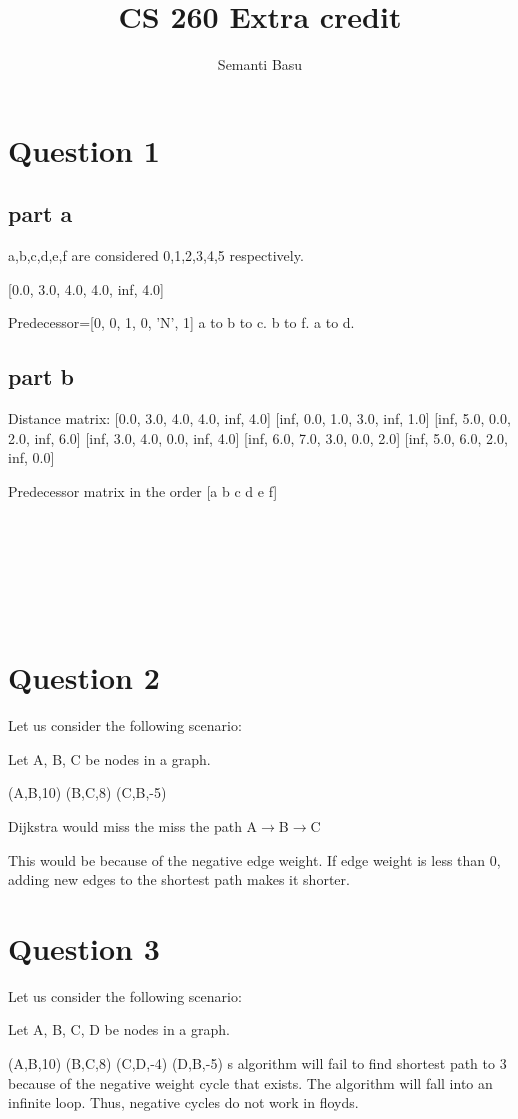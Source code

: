 \documentclass{article}
\begin{document}
\title {CS 260 Extra credit}
\author{Semanti Basu}
\maketitle


\section*{Question 1}
\subsection*{part a}

a,b,c,d,e,f are considered 0,1,2,3,4,5 respectively.

[0.0, 3.0, 4.0, 4.0, inf, 4.0]

Predecessor=[0, 0, 1, 0, 'N', 1]
 a to b to c. b to f. a to d.

\subsection*{part b}


Distance matrix:
[0.0, 3.0, 4.0, 4.0, inf, 4.0]
[inf, 0.0, 1.0, 3.0, inf, 1.0]
[inf, 5.0, 0.0, 2.0, inf, 6.0]
[inf, 3.0, 4.0, 0.0, inf, 4.0]
[inf, 6.0, 7.0, 3.0, 0.0, 2.0]
[inf, 5.0, 6.0, 2.0, inf, 0.0]


Predecessor matrix in the order [a b c d e f] \\
[0, 0, 1, 0, 'N', 1] \\
['N', 1, 1, 1, 'N', 1]\\
['N', 2, 2, 2, 'N', 2]\\
['N', 3, 3, 3, 'N', 3]\\
['N', 4, 4, 4, 4, 4]\\
['N', 3, 1, 5, 'N', 5]\\



\section*{Question 2}

Let us consider the following scenario:
 
Let A, B, C be nodes in a graph.

(A,B,10)
(B,C,8)
(C,B,-5)

Dijkstra would miss the miss the path A$\rightarrow$B$\rightarrow$C

This would be because of the negative edge weight. If edge weight is less than 0, adding new edges to the shortest path makes it shorter.


\section*{Question 3}


Let us consider the following scenario:

Let A, B, C, D be nodes in a graph.

(A,B,10)
(B,C,8)
(C,D,-4)
(D,B,-5)
s algorithm will fail to find shortest path to 3 because of the negative weight cycle that exists. The algorithm will fall into an infinite loop. Thus, negative cycles do not work in floyds.
\end{document}
